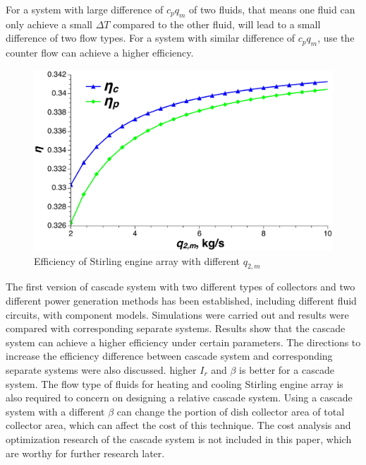 \documentclass{article}
\begin{document}
For a system with large difference of $c_pq_m$ of two fluids, that means one fluid can only achieve a small $\Delta T$ compared to the other fluid, will lead to a small difference of two flow types. For a system with similar difference of $c_pq_m$, use the counter flow can achieve a higher efficiency.

\noindent \begin{figure}[H]
\begin{center}
	\includegraphics[width = 0.8\columnwidth, angle = 0]{./graphics/SEAflowtypes}
	\caption{Efficiency of Stirling engine array with different $q_{2,m}$}
	\label{fig:SEAflowtypes}
\end{center}
\end{figure}

The first version of cascade system with two different types of collectors and two different power generation methods has been established, including different fluid circuits, with component models. Simulations were carried out and results were compared with corresponding separate systems. Results show that the cascade system can achieve a higher efficiency under certain parameters. The directions to increase the efficiency difference between cascade system and corresponding separate systems were also discussed. higher $I_r$ and $\beta$ is better for a cascade system. The flow type of fluids for heating and cooling Stirling engine array is also required to concern on designing a relative cascade system. Using a cascade system with a different $\beta$ can change the portion of dish collector area of total collector area, which can affect the cost of this technique. The cost analysis and optimization research of the cascade system is not included in this paper, which are worthy for further research later.

\clearpage
\printnomenclature[2.5cm]{}
\clearpage



\end{document}
